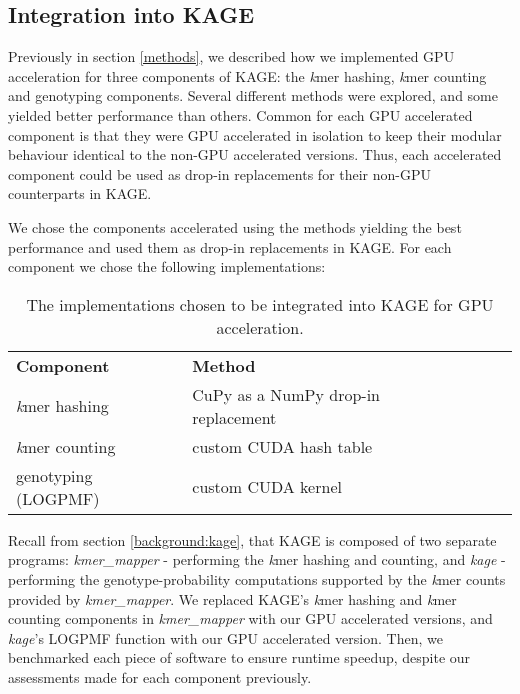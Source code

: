 \subsection{Integration into KAGE} \label{methods:integration_into_kage}
Previously in section \ref{methods}, we described how we implemented GPU acceleration for three components of KAGE: the \textit{k}mer hashing, \textit{k}mer counting and genotyping components.
Several different methods were explored, and some yielded better performance than others.
Common for each GPU accelerated component is that they were GPU accelerated in isolation to keep their modular behaviour identical to the non-GPU accelerated versions.
Thus, each accelerated component could be used as drop-in replacements for their non-GPU counterparts in KAGE.

We chose the components accelerated using the methods yielding the best performance and used them as drop-in replacements in KAGE.
For each component we chose the following implementations:

\begin{table}[H]
\begin{center}
\begin{tabular}{lllll}
\multicolumn{1}{l|}{\textbf{Component}} & \multicolumn{1}{l}{\textbf{Method}} &  \\ \cline{1-2}
\multicolumn{1}{l|}{\textit{k}mer hashing} & \multicolumn{1}{l}{CuPy as a NumPy drop-in replacement} &  \\
\multicolumn{1}{l|}{\textit{k}mer counting} & \multicolumn{1}{l}{custom CUDA hash table} &  \\
\multicolumn{1}{l|}{genotyping (LOGPMF)} & \multicolumn{1}{l}{custom CUDA kernel} &  \\
\end{tabular}
\end{center}
\caption{
  The implementations chosen to be integrated into KAGE for GPU acceleration.
}
\label{methods:integration_into_kage:tables:chosen_methods}
\end{table}

Recall from section \ref{background:kage}, that KAGE is composed of two separate programs: \textit{kmer\_mapper} - performing the \textit{k}mer hashing and counting, and \textit{kage} - performing the genotype-probability computations supported by the \textit{k}mer counts provided by \textit{kmer\_mapper}.
We replaced KAGE's \textit{k}mer hashing and \textit{k}mer counting components in \textit{kmer\_mapper} with our GPU accelerated versions, and \textit{kage}'s LOGPMF function with our GPU accelerated version.
Then, we benchmarked each piece of software to ensure runtime speedup, despite our assessments made for each component previously.

